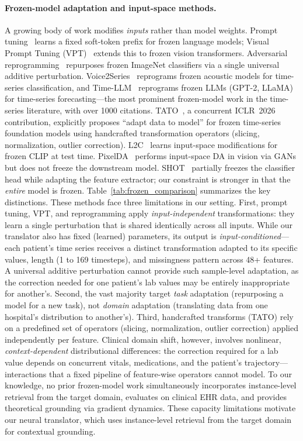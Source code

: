 \paragraph{Frozen-model adaptation and input-space methods.}
A growing body of work modifies \emph{inputs} rather than model weights.
Prompt tuning~\cite{lester2021prompt} learns a fixed soft-token prefix for frozen language models;
Visual Prompt Tuning (VPT)~\cite{jia2022vpt} extends this to frozen vision transformers.
Adversarial reprogramming~\cite{elsayed2019reprogramming} repurposes frozen ImageNet classifiers
via a single universal additive perturbation.
Voice2Series~\cite{yang2021voice2series} reprograms frozen acoustic models for time-series
classification, and Time-LLM~\cite{jin2024timellm} reprograms frozen LLMs (GPT-2, LLaMA) for
time-series forecasting---the most prominent frozen-model work in the time-series literature,
with over 1000 citations.
TATO~\cite{qiu2026tato}, a concurrent ICLR~2026 contribution, explicitly proposes
``adapt data to model'' for frozen time-series foundation models using handcrafted
transformation operators (slicing, normalization, outlier correction).
L2C~\cite{chi2025l2c} learns input-space modifications for frozen CLIP at test time.
PixelDA~\cite{bousmalis2017pixelda} performs input-space DA in vision via GANs but does
not freeze the downstream model.
SHOT~\cite{liang2020shot} partially freezes the classifier head while adapting the feature
extractor; our constraint is stronger in that the \emph{entire} model is frozen.
Table~\ref{tab:frozen_comparison} summarizes the key distinctions.
These methods face three limitations in our setting.
First, prompt tuning, VPT, and reprogramming apply \emph{input-independent} transformations: they learn a single perturbation that is shared identically across all inputs.
While our translator also has fixed (learned) parameters, its output is \emph{input-conditioned}---each patient's time series receives a distinct transformation adapted to its specific values, length (1 to 169 timesteps), and missingness pattern across 48+ features.
A universal additive perturbation cannot provide such sample-level adaptation, as the correction needed for one patient's lab values may be entirely inappropriate for another's.
Second, the vast majority target \emph{task} adaptation (repurposing a model for a new task),
not \emph{domain} adaptation (translating data from one hospital's distribution to another's).
Third, handcrafted transforms (TATO) rely on a predefined set of operators (slicing, normalization, outlier correction) applied independently per feature.
Clinical domain shift, however, involves nonlinear, \emph{context-dependent} distributional differences: the correction required for a lab value depends on concurrent vitals, medications, and the patient's trajectory---interactions that a fixed pipeline of feature-wise operators cannot model.
To our knowledge, no prior frozen-model work simultaneously incorporates instance-level retrieval from the target domain,
evaluates on clinical EHR data, and provides theoretical grounding via gradient dynamics.
These capacity limitations motivate our
neural translator, which uses instance-level retrieval from the target domain for contextual
grounding.

